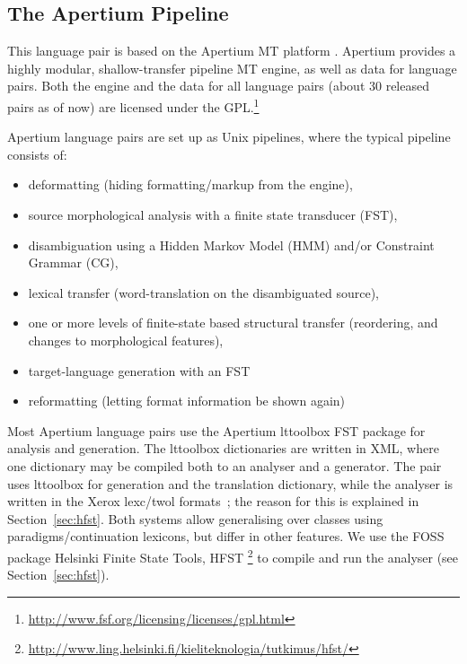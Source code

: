\documentclass{book}
\begin{document}
\subsection{The Apertium Pipeline}
This language pair is based on the Apertium MT
platform \citep{forcada2011afp,zubizarreta2009amt}. Apertium provides a
highly modular, shallow-transfer pipeline MT engine, as well as data
for language pairs. Both the engine and the data for all language
pairs (about 30 released pairs as of now) are licensed under the
GPL.\footnote{\href{http://www.fsf.org/licensing/licenses/gpl.html}{http://www.fsf.org/licensing/licenses/gpl.html}}

Apertium language pairs are set up as Unix pipelines, where the
typical pipeline consists of:

\begin{itemize}
\item deformatting (hiding formatting/markup from the engine),
\item source morphological analysis with a finite state transducer
  (FST),
\item disambiguation using a Hidden Markov Model (HMM) and/or
  Constraint Grammar (CG), 
\item lexical transfer (word-translation on the disambiguated source),
\item one or more levels of finite-state based structural transfer
  (reordering, and changes to morphological features),
\item target-language generation with an FST
\item reformatting (letting format information be shown again)
\end{itemize}

Most Apertium language pairs use the Apertium lttoolbox FST package
for analysis and generation. The lttoolbox dictionaries are written in
XML, where one dictionary may be compiled both to an analyser and a
generator. The \smenob{} pair uses lttoolbox for \nob{} generation and
the translation dictionary, while the \sme{} analyser is written in
the Xerox lexc/twol formats~\citep{beesley2003fsm}; the reason for
this is explained in Section~\ref{sec:hfst}. Both systems allow
generalising over classes using paradigms/continuation lexicons, but
differ in other features. We use the FOSS package Helsinki Finite
State Tools, HFST
\citep{linden2011hfst}\footnote{\href{http://www.ling.helsinki.fi/kieliteknologia/tutkimus/hfst/}{http://www.ling.helsinki.fi/kieliteknologia/tutkimus/hfst/}}
to compile and run the analyser (see Section~\ref{sec:hfst}).
\end{document}
